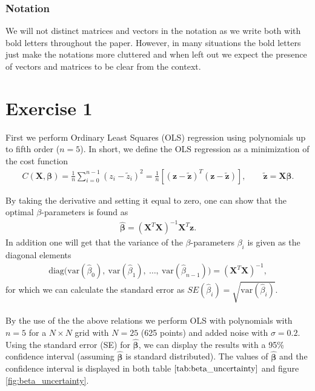 \documentclass[norsk,a4paper,12pt]{scrartcl}
\renewcommand{\vec}[1]{\mathbf{#1}} %
\begin{document}
\subsubsection{Notation}
We will not distinct matrices and vectors in the notation as we write both with bold letters throughout the paper. However, in many situations the bold letters just make the notations more cluttered and when left out we expect the presence of vectors and matrices to be clear from the context.


\newpage
\section{Exercise 1}\label{sec:exer1}
First we perform Ordinary Least Squares (OLS) regression using polynomials up to fifth order ($n=5$). In short, we define the OLS regression as a minimization of the cost function
\begin{align*}
    C(\vec{X}, \boldsymbol{\beta})=\frac{1}{n} \sum_{i=0}^{n-1}\left(z_{i}-\tilde{z}_i\right)^{2}=
    \frac{1}{n}\left[(\boldsymbol{z}-\boldsymbol{\tilde{z}})^{T}(\boldsymbol{z}-\boldsymbol{\tilde{z}})\right], \qquad \vec{\tilde{z}} = \vec{X}\boldsymbol{\beta}.
\end{align*}

By taking the derivative and setting it equal to zero, one can show that the optimal $\beta$-parameters is found as
\begin{align*}
    \hat{\boldsymbol{\beta}} = (\vec{X}^T\vec{X})^{-1}\vec{X}^T\vec{z}.
\end{align*}
In addition one will get that the variance of the $\beta$-parameters $\beta_i$ is given as the diagonal elements
\begin{align*}
    \text{diag}\Big(\text{var}(\hat{\beta}_0),\ \text{var}(\hat{\beta}_1),\ \hdots,\ \text{var}(\hat{\beta}_{n-1})\Big) = (\vec{X}^T\vec{X})^{-1} ,
\end{align*}
for which we can calculate the standard error as $SE(\hat{\beta}_i) = \sqrt{\text{var}(\hat{\beta}_i)}$. \\
\\
By the use of the the above relations we perform OLS with polynomials with $n=5$ for a $N\times N$ grid with $N = 25$ (625 points) and added noise with $\sigma = 0.2$. Using the standard error (SE) for $ \hat{\boldsymbol{\beta}}$, we can display the results with a 95\% confidence interval (assuming $\hat{\boldsymbol{\beta}}$ is standard distributed). The values of $ \hat{\boldsymbol{\beta}}$ and the confidence interval is displayed in both table $\ref{tab:beta_uncertainty}$ and figure \ref{fig:beta_uncertainty}. 
\end{document}

